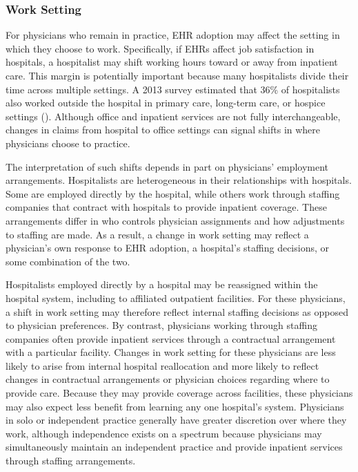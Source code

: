 \documentclass[12pt]{article}
\begin{document}
\subsubsection{Work Setting}\label{sec:worksetting}

For physicians who remain in practice, EHR adoption may affect the setting in which they choose to work. Specifically, if EHRs affect job satisfaction in hospitals, a hospitalist may shift working hours toward or away from inpatient care. This margin is potentially important because many hospitalists divide their time across multiple settings. A 2013 survey estimated that 36\% of hospitalists also worked outside the hospital in primary care, long-term care, or hospice settings (\cite{Today}). Although office and inpatient services are not fully interchangeable, changes in claims from hospital to office settings can signal shifts in where physicians choose to practice.

The interpretation of such shifts depends in part on physicians' employment arrangements. Hospitalists are heterogeneous in their relationships with hospitals. Some are employed directly by the hospital, while others work through staffing companies that contract with hospitals to provide inpatient coverage. These arrangements differ in who controls physician assignments and how adjustments to staffing are made. As a result, a change in work setting may reflect a physician's own response to EHR adoption, a hospital's staffing decisions, or some combination of the two.

Hospitalists employed directly by a hospital may be reassigned within the hospital system, including to affiliated outpatient facilities. For these physicians, a shift in work setting may therefore reflect internal staffing decisions as opposed to physician preferences. By contrast, physicians working through staffing companies often provide inpatient services through a contractual arrangement with a particular facility. Changes in work setting for these physicians are less likely to arise from internal hospital reallocation and more likely to reflect changes in contractual arrangements or physician choices regarding where to provide care. Because they may provide coverage across facilities, these physicians may also expect less benefit from learning any one hospital's system. Physicians in solo or independent practice generally have greater discretion over where they work, although independence exists on a spectrum because physicians may simultaneously maintain an independent practice and provide inpatient services through staffing arrangements.
\end{document}
